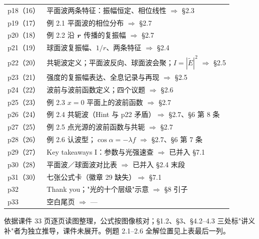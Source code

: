 \documentclass[10pt]{ctexart}
\newcommand{\Etil}{\tilde{E}}
\begin{document}
\begin{center}
\begin{tabular}{@{}p{2.35cm}p{14.2cm}@{}}
p18（16） & 平面波两条特征：振幅恒定、相位线性 $\Rightarrow$ §2.3\\
p19（17） & 例 2.1 平面波的相位分布 $\Rightarrow$ §2.7\\
p20（18） & 例 2.2 沿 $\boldsymbol{r}$ 传播的复振幅 $\Rightarrow$ §2.7\\
p21（19） & 球面波复振幅、$1/r$、两条特征 $\Rightarrow$ §2.4\\
p22（20） & 共轭波定义；平面波反向、球面波会聚；$I=|\Etil|^2$ $\Rightarrow$ §2.5\\
p23（21） & 强度的复振幅表达、全息记录与再现 $\Rightarrow$ §2.5\\
p24（22） & 波前与波前函数定义；四个议题 $\Rightarrow$ §2.6\\
p25（23） & 例 2.3 $x=0$ 平面上的波前函数 $\Rightarrow$ §2.7\\
p26（24） & 例 2.4 共轭波（Hint 与 p22 矛盾）$\Rightarrow$ §2.7、§6 第 8 条\\
p27（25） & 例 2.5 点光源的波前函数与共轭 $\Rightarrow$ §2.7\\
p28（26） & 例 2.6 认波型；$\cos\alpha=-\lambda f$ $\Rightarrow$ §2.7、§6 第 7 条\\
p29（27） & Key takeaways I：参数与光强速查 $\Rightarrow$ 已并入 §7.1\\
p30（28） & 平面波／球面波对比表 $\Rightarrow$ 已并入 §2.4 末段\\
p31（30） & 七张公式卡（徽章 29 缺失）$\Rightarrow$ §7.1\\
p32 & Thank you；"光的十个层级"示意 $\Rightarrow$ §8 引子\\
p33 & 空白尾页 $\Rightarrow$ ---\\
\end{tabular}
\tabbot
\end{center}

{\footnotesize\color{inkgray}依据课件 33 页逐页读图整理，公式按图像核对；§1.2、§3、§4.2--4.3 三处标"讲义补"者为独立推导，课件未展开。例题 2.1--2.6 全解位置见上表最后一列。}
\end{document}
